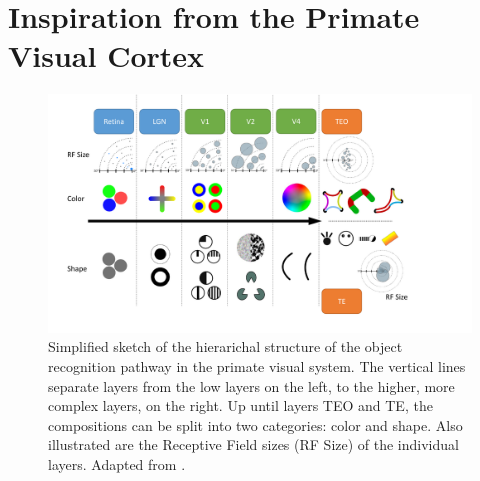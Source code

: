 \section{Inspiration from the Primate Visual Cortex}
\label{sec:pvc}


\begin{figure}[h!]
\centering
\includegraphics[width=1.1\textwidth]{graphics/pvc_figure1}
\caption[Object Recognition Pathway]{
Simplified sketch of the hierarichal structure of the object recognition pathway in the primate visual system.
The vertical lines separate layers from the low layers on the left, to the higher, more complex layers, on the right.
Up until layers TEO and TE, the compositions can be split into two categories: color and shape.
Also illustrated are the Receptive Field sizes (RF Size) of the individual layers.
Adapted from \cite{kruger2013deep}.
}
\label{fig:pcv1}
\end{figure}